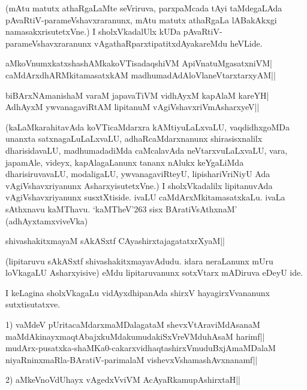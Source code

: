 (mAtu matutx athaRgaLaMte seVriruva, parxpaMcada tAyi taMdegaLAda pAvaRtiV-parameVshavxraranunx, mAtu matutx athaRgaLa lABakAkxgi namasakxrisutetxVne.) I sholxVkadalUlx kUDa pAvaRtiV-parameVshavxraranunx vAgathaRparxtipatitxdAyakareMdu heVLide.

\begin{shloka}
aMkoVnumxkatxshashAMkakoVTisadaqshiVM ApiVnatuMgasatxniVM|\label{31a}\\
caMdArxdhARMkitamasatxkAM madhumadAdAloVlaneVtarxtarxyAM||
\end{shloka}

\begin{shloka}
biBArxNAmanishaM varaM japavaTiVM vidhAyxM kapAlaM kareYH|\\
AdhAyxM ywvanagaviRtAM lipitanuM vAgiVshavxriVmAsharxyeV||
\end{shloka}

(kaLaMkarahitavAda koVTicaMdarxra kAMtiyuLaLxvaLU, vaqdidhxgoMDa unanxta satxnagaLuLaLxvaLU, adhaRcaMdarxnanunx shirasisxnalilx dharisidavaLU, madhumadadiMda caMcalavAda neVtarxvuLaLxvaLU, vara, japamAle, videyx, kapAlagaLanunx tananx nAlukx  keYgaLiMda dharisiruvavaLU, modaligaLU, ywvanagaviRteyU, lipishariVriNiyU Ada vAgiVshavxriyanunx AsharxyisutetxVne.) I sholxVkadalilx lipitanuvAda vAgiVshavxriyanunx susxtXtiside. ivaLU caMdArxMkitamasatxkaLu. ivaLa sAthxnavu kaMThavu. `kaMTheV\char'263 sisx BAratiVsAthxnaM'\label{31c} (adhAyxtamxviveVka)

\begin{shloka}
shivashakitxmayaM sAkASxtf CAyashirxtajagatatxrXyaM||\label{32b}
\end{shloka}

(lipitaruvu sAkASxtf shivashakitxmayavAdudu. idara neraLanunx mUru loVkagaLU Asharxyisive) eMdu lipitaruvanunx sotxVtarx  mADiruva eDeyU ide.

I keLagina sholxVkagaLu vidAyxdhipanAda shirxV hayagirxVvananunx sutxtisutatxve.

\begin{itemize}


\begin{shloka}
\item[1)]  vaMdeV pUritacaMdarxmaMDalagataM shevxVtAraviMdAsanaM\label{32a} \\
maMdAkinayxmaqtAbajxkuMdakumudakiSxVreVMduhAsaM harimf||\\

\medskip
mudArx-pusatxka-shaMKa0-cakarxvidhaqtashirxVmuduBxjAmaMDalaM\\
niyaRninxmaRla-BAratiV-parimalaM vishevxVshamashAvxnanamf||
\end{shloka}


\begin{shloka}
\item[2)]  aMkeVnoVdUhayx vAgedxVviVM AcAyaRkamupAshirxtaH||\label{32}
\end{shloka}
\end{itemize}

